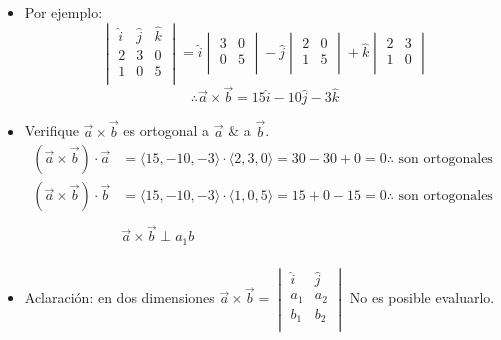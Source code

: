 \begin{itemize}
    \item Por ejemplo:
        \begin{equation*}
            \begin{vmatrix}
                \hat{i} & \hat{j} & \hat{k} \\ 
                2 & 3 & 0 \\ 
                1 & 0 & 5 \\ 
            \end{vmatrix} = \hat{i}\begin{vmatrix}
                3 & 0 \\ 
                0 & 5 \\ 
            \end{vmatrix} - \hat{j}\begin{vmatrix}
                2 & 0 \\ 
                1 & 5 \\ 
            \end{vmatrix} + \hat{k} \begin{vmatrix}
                2 & 3 \\ 
                1 & 0 \\ 
            \end{vmatrix}
        \end{equation*}
        \[
          \therefore \vec{a}\times \vec{b} = 15\hat{i}-10\hat{j}-3\hat{k}
        \]
    
    \item Verifique $\vec{a}\times \vec{b}$ es ortogonal a $\vec{a}$ \& a $\vec{b}$.
        \begin{align*}
            (\vec{a}\times \vec{b})\cdot \vec{a} & = \langle 15,-10,-3 \rangle \cdot \langle 2,3,0 \rangle = 30-30+0 = 0 \therefore \text{  son ortogonales  } \\ 
            (\vec{a}\times \vec{b}) \cdot \vec{b} & = \langle 15, -10,-3\rangle \cdot \langle 1,0,5 \rangle = 15+0-15 = 0 \therefore \text{  son ortogonales  } \\ 
            \\ 
            & \vec{a}\times \vec{b} \perp a_1b \\ 
        \end{align*}
    
    \item Aclaración: en dos dimensiones $\vec{a}\times \vec{b} = \begin{vmatrix}
        \hat{i} & \hat{j} \\ 
        a_1 & a_2 \\ 
        b_1 & b_2 \\ 
    \end{vmatrix} $  No es posible evaluarlo.
    

\end{itemize}
